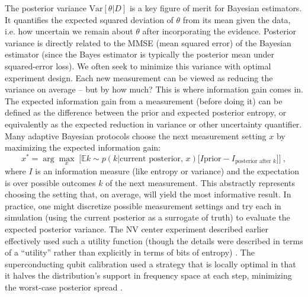 The posterior variance $\mathrm{Var}[\theta | D]$ is a key figure of
merit for Bayesian estimators. It quantifies the expected squared
deviation of $\theta$ from its mean given the data, i.e. how uncertain
we remain about $\theta$ after incorporating the evidence. Posterior
variance is directly related to the MMSE (mean squared error) of the
Bayesian estimator (since the Bayes estimator is typically the
posterior mean under squared-error loss). We often seek to minimize
this variance with optimal experiment design. Each new measurement can
be viewed as reducing the variance on average – but by how much? This
is where information gain comes in. The expected information gain from
a measurement (before doing it) can be defined as the difference
between the prior and expected posterior entropy, or equivalently as
the expected reduction in variance or other uncertainty
quantifier. Many adaptive Bayesian protocols choose the next
measurement setting $x$ by maximizing the expected information gain:
\[
x^* = \arg\max_x \; \Big[ \mathbb{E}{k \sim p(k|\text{current posterior},\,x)} \big[ I{\text{prior}} - I_{\text{posterior after }k} \big] \Big]~,
\]
where $I$ is an information measure (like entropy or variance) and the
expectation is over possible outcomes $k$ of the next
measurement. This abstractly represents choosing the setting that, on
average, will yield the most informative result. In practice, one
might discretize possible measurement settings and try each in
simulation (using the current posterior as a surrogate of truth) to
evaluate the expected posterior variance. The NV center experiment
described earlier effectively used such a utility function (though the
details were described in terms of a “utility” rather than explicitly
in terms of bits of entropy) . The superconducting qubit calibration
used a strategy that is locally optimal in that it halves the
distribution’s support in frequency space at each step, minimizing the
worst-case posterior spread .



